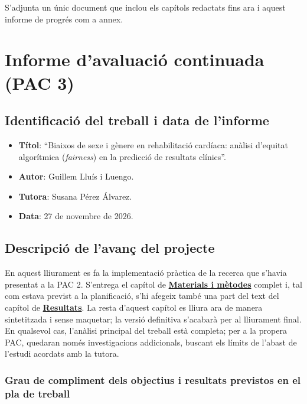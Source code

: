 \documentclass[CAT]{TFUOC}%
\begin{document}
S'adjunta un únic document que inclou els capítols redactats fins ara i aquest informe de progrés com a annex.

\chapter{Informe d'avaluació continuada (PAC 3)}\label{informe-davaluaciuxf3-continuada-pac-3}

\section{Identificació del treball i data de l'informe}\label{identificaciuxf3-del-treball-i-data-de-linforme-1}

\begin{itemize}
\item
  \textbf{Títol}: ``Biaixos de sexe i gènere en rehabilitació cardíaca: anàlisi d'equitat algorítmica (\emph{fairness}) en la predicció de resultats clínics''.
\item
  \textbf{Autor}: Guillem Lluís i Luengo.
\item
  \textbf{Tutora}: Susana Pérez Álvarez.
\item
  \textbf{Data}: 27 de novembre de 2026.
\end{itemize}

\section{Descripció de l'avanç del projecte}\label{descripciuxf3-de-lavanuxe7-del-projecte-1}

En aquest lliurament es fa la implementació pràctica de la recerca que s'havia presentat a la PAC 2. S'entrega el capítol de \textbf{\hyperref[materials-i-muxe8todes]{Materials i mètodes}} complet i, tal com estava previst a la planificació, s'hi afegeix també una part del text del capítol de \textbf{\hyperref[resultats]{Resultats}}. La resta d'aquest capítol es lliura ara de manera sintetitzada i sense maquetar; la versió definitiva s'acabarà per al lliurament final. En qualsevol cas, l'anàlisi principal del treball està completa; per a la propera PAC, quedaran només investigacions addicionals, buscant els límits de l'abast de l'estudi acordats amb la tutora.

\subsection{Grau de compliment dels objectius i resultats previstos en el pla de treball}\label{grau-de-compliment-dels-objectius-i-resultats-previstos-en-el-pla-de-treball-1}
\end{document}
